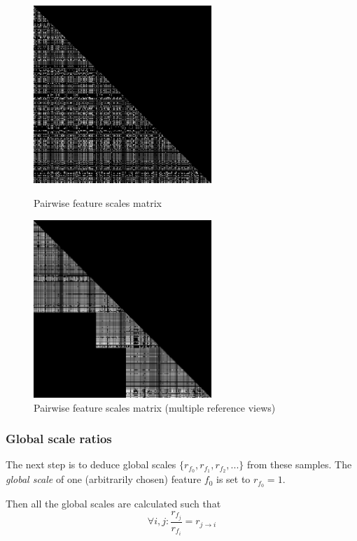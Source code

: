 \documentclass{scrreprt}
\begin{document}
\begin{figure}
\centering
\includegraphics[width=0.6\textwidth]{ratios.png}
\caption{Pairwise feature scales matrix}
\label{fig:ratios}

\vspace{1cm}

\includegraphics[width=0.6\textwidth]{ratios_multiref.png}
\caption{Pairwise feature scales matrix (multiple reference views)}
\label{fig:ratios_multiref}
\end{figure}


\subsubsection{Global scale ratios}
The next step is to deduce global scales $\{ r_{f_0}, r_{f_1}, r_{f_2}, ... \}$ from these samples. The \emph{global scale} of one (arbitrarily chosen) feature $f_0$ is set to $r_{f_0} = 1$.

Then all the global scales are calculated such that
\begin{equation*}
\forall i,j : \frac{r_{f_j}}{r_{f_i}} = r_{j\rightarrow i}
\end{equation*}
\end{document}

